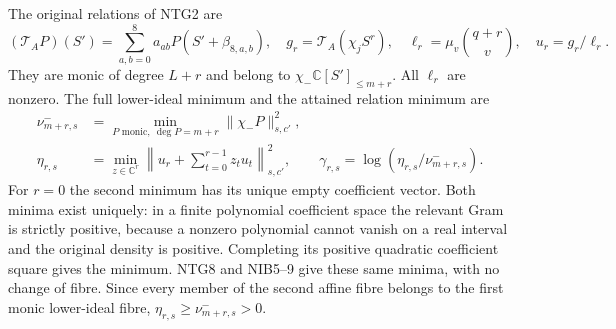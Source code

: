 The original relations of NTG2 are
\[
 (\mathcal T_AP)(S')=\sum_{a,b=0}^8a_{ab}P(S'+\beta_{8,a,b}),
 \quad g_r=\mathcal T_A(\chi_jS^r),\quad
 \ell_r=\mu_v\binom{q+r}{v},\quad u_r=g_r/\ell_r.       \tag{ATA3}
\]
They are monic of degree $L+r$ and belong to
$\chi_-\mathbb C[S']_{\le m+r}$.  All $\ell_r$ are nonzero.
The full lower-ideal minimum and the attained relation minimum are
\[
\begin{aligned}
 \nu^-_{m+r,s}
 &=\min_{P\text{ monic},\ \deg P=m+r}\|\chi_-P\|_{s,c'}^2,\\
 \eta_{r,s}
 &=\min_{z\in\mathbb C^r}
       \left\|u_r+\sum_{t=0}^{r-1}z_tu_t\right\|_{s,c'}^2,
 \qquad \gamma_{r,s}=\log(\eta_{r,s}/\nu^-_{m+r,s}).
\end{aligned}\tag{ATA4}
\]
For $r=0$ the second minimum has its unique empty coefficient vector.
Both minima exist uniquely: in a finite polynomial coefficient space
the relevant Gram is strictly positive, because a nonzero polynomial
cannot vanish on a real interval and the original density is positive.
Completing its positive quadratic coefficient square gives the minimum.
NTG8 and NIB5--9 give these same minima, with no change of fibre.
Since every member of the second affine fibre belongs to the first
monic lower-ideal fibre, $\eta_{r,s}\ge\nu^-_{m+r,s}>0$.


